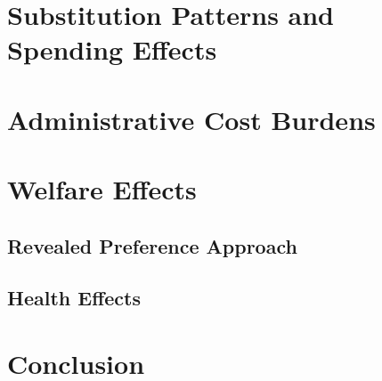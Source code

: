 \documentclass[hyperref={colorlinks,citecolor=blue,linkcolor=blue,urlcolor=blue}]{beamer}
\begin{document}
\section{Substitution Patterns and Spending Effects}




\section{Administrative Cost Burdens}




\section{Welfare Effects}

\subsection{Revealed Preference Approach}




% 

\subsection{Health Effects}




\section{Conclusion}

\end{document}
